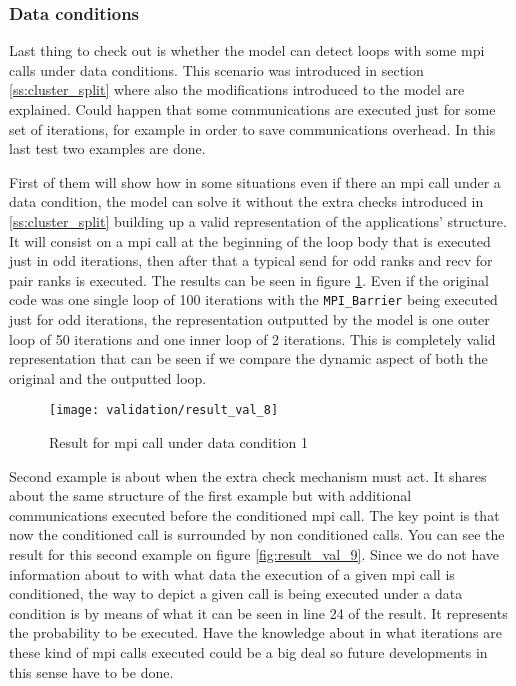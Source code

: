 \subsubsection{Data conditions}

Last thing to check out is whether the model can detect loops with some mpi calls
under data conditions. This scenario was introduced in section
\ref{ss:cluster_split} where also the modifications introduced to the model are
explained. Could happen that some communications are executed just for some set
of iterations, for example in order to save communications overhead. In this
last test two examples are done. 

First of them will show how in some situations
even if there an mpi call under a data condition, the model can solve it without
the extra checks introduced in \ref{ss:cluster_split} building up a valid
representation of the applications' structure. It will consist on a mpi call at
the beginning of the loop body that is executed just in odd iterations, then
after that a typical send for odd ranks and recv for pair ranks is executed. The
results can be seen in figure \ref{fig:result_val_8}. Even if the original code
was one single loop of 100 iterations with the \texttt{MPI\_Barrier} being
executed just for odd iterations, the representation outputted by the model is 
one outer loop of 50 iterations and one inner loop of 2 iterations. This is
completely valid representation that can be seen if we compare the dynamic
aspect of both the original and the outputted loop. 

\begin{figure}[H]
    \centering
    \texttt{[image: validation/result\_val\_8]}
    \caption{Result for mpi call under data condition 1}
    \label{fig:result_val_8}
\end{figure}

Second example is about when the extra check mechanism must act. It shares
about the same structure of the first example but with additional communications
executed before the conditioned mpi call. The key point is that now the
conditioned call is surrounded by non conditioned calls. You can see the result
for this second example on figure \ref{fig:result_val_9}. Since we do not have
information about to with what data the execution of a given mpi call is
conditioned, the way to depict a given call is being executed under a data
condition is by means of what it can be seen in line 24 of the result. It
represents the probability to be executed. Have the knowledge about in what
iterations are these kind of mpi calls executed could be a big deal so future
developments in this sense have to be done.

